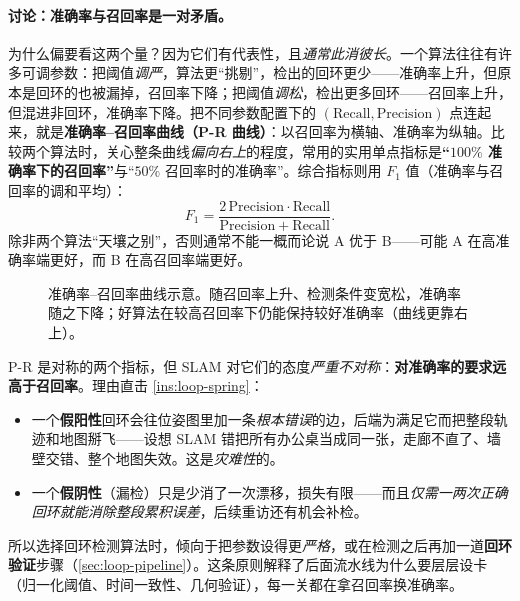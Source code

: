 \paragraph{讨论：准确率与召回率是一对矛盾。}
为什么偏要看这两个量？因为它们有代表性，且\emph{通常此消彼长}\cite{gaoxiang2019slam14}。一个算法往往有许多可调参数：把阈值\emph{调严}，算法更“挑剔”，检出的回环更少——准确率上升，但原本是回环的也被漏掉，召回率下降；把阈值\emph{调松}，检出更多回环——召回率上升，但混进非回环，准确率下降。把不同参数配置下的 $(\mathrm{Recall},\mathrm{Precision})$ 点连起来，就是\textbf{准确率--召回率曲线（P-R 曲线）}：以召回率为横轴、准确率为纵轴。比较两个算法时，关心整条曲线\emph{偏向右上}的程度，常用的实用单点指标是\textbf{“$100\%$ 准确率下的召回率”}与“$50\%$ 召回率时的准确率”。综合指标则用 $F_1$ 值（准确率与召回率的调和平均）：
\begin{equation}
  F_1=\frac{2\,\mathrm{Precision}\cdot\mathrm{Recall}}{\mathrm{Precision}+\mathrm{Recall}}.
  \label{eq:loop-f1}
\end{equation}
除非两个算法“天壤之别”，否则通常不能一概而论说 A 优于 B——可能 A 在高准确率端更好，而 B 在高召回率端更好。

\begin{figure}[ht]
\centering
{}
\caption{准确率--召回率曲线示意。随召回率上升、检测条件变宽松，准确率随之下降；好算法在较高召回率下仍能保持较好准确率（曲线更靠右上）。}
\label{fig:loop-prcurve}
\end{figure}

\begin{insight}\label{ins:loop-precision}
P-R 是对称的两个指标，但 SLAM 对它们的态度\emph{严重不对称}\cite{gaoxiang2019slam14}：\textbf{对准确率的要求远高于召回率}。理由直击 \cref{ins:loop-spring}：
\begin{itemize}
  \item 一个\textbf{假阳性}回环会往位姿图里加一条\emph{根本错误}的边，后端为满足它而把整段轨迹和地图掰飞——设想 SLAM 错把所有办公桌当成同一张，走廊不直了、墙壁交错、整个地图失效。这是\emph{灾难性}的。
  \item 一个\textbf{假阴性}（漏检）只是少消了一次漂移，损失有限——而且\emph{仅需一两次正确回环就能消除整段累积误差}，后续重访还有机会补检。
\end{itemize}
所以选择回环检测算法时，倾向于把参数设得更\emph{严格}，或在检测之后再加一道\textbf{回环验证}步骤（\cref{sec:loop-pipeline}）。这条原则解释了后面流水线为什么要层层设卡（归一化阈值、时间一致性、几何验证），每一关都在拿召回率换准确率。
\end{insight}

